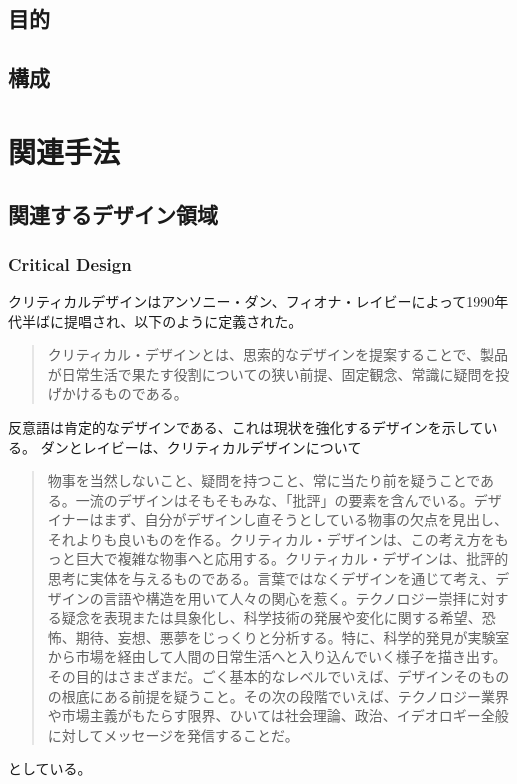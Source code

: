 \documentclass{jsarticle}
\begin{document}
\newpage
\subsection{目的}
\newpage
\subsection{構成}


\newpage
\section{関連手法}
\subsection{関連するデザイン領域}

\subsubsection{Critical Design}
クリティカルデザインはアンソニー・ダン、フィオナ・レイビーによって1990年代半ばに提唱され、以下のように定義された。
\begin{quotation}
  クリティカル・デザインとは、思索的なデザインを提案することで、製品が日常生活で果たす役割についての狭い前提、固定観念、常識に疑問を投げかけるものである。
\end{quotation}
反意語は肯定的なデザインである、これは現状を強化するデザインを示している。
ダンとレイビーは、クリティカルデザインについて
\begin{quotation}
  物事を当然しないこと、疑問を持つこと、常に当たり前を疑うことである。一流のデザインはそもそもみな、「批評」の要素を含んでいる。デザイナーはまず、自分がデザインし直そうとしている物事の欠点を見出し、それよりも良いものを作る。クリティカル・デザインは、この考え方をもっと巨大で複雑な物事へと応用する。クリティカル・デザインは、批評的思考に実体を与えるものである。言葉ではなくデザインを通じて考え、デザインの言語や構造を用いて人々の関心を惹く。テクノロジー崇拝に対する疑念を表現または具象化し、科学技術の発展や変化に関する希望、恐怖、期待、妄想、悪夢をじっくりと分析する。特に、科学的発見が実験室から市場を経由して人間の日常生活へと入り込んでいく様子を描き出す。その目的はさまざまだ。ごく基本的なレベルでいえば、デザインそのものの根底にある前提を疑うこと。その次の段階でいえば、テクノロジー業界や市場主義がもたらす限界、ひいては社会理論、政治、イデオロギー全般に対してメッセージを発信することだ。
\end{quotation}
としている。
\end{document}
